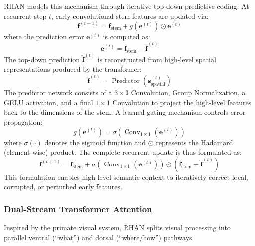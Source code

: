 \documentclass[12pt,a4paper]{article}
\begin{document}
RHAN models this mechanism through iterative top-down predictive coding. At recurrent step $t$, early convolutional stem features are updated via:
\begin{equation}
  \mathbf{f}^{(t+1)} = \mathbf{f}_{\mathrm{stem}} + g(\mathbf{e}^{(t)}) \odot \mathbf{e}^{(t)}
  \label{eq:feedback_update}
\end{equation}
where the prediction error $\mathbf{e}^{(t)}$ is computed as:
\begin{equation}
  \mathbf{e}^{(t)} = \mathbf{f}_{\mathrm{stem}} - \hat{\mathbf{f}}^{(t)}
\end{equation}
The top-down prediction $\hat{\mathbf{f}}^{(t)}$ is reconstructed from high-level spatial representations produced by the transformer:
\begin{equation}
  \hat{\mathbf{f}}^{(t)} = \operatorname{Predictor}\left(\mathbf{s}_{\mathrm{spatial}}^{(t)}\right)
\end{equation}
The predictor network consists of a $3\times3$ Convolution, Group Normalization, a GELU activation, and a final $1\times1$ Convolution to project the high-level features back to the dimensions of the stem. A learned gating mechanism controls error propagation:
\begin{equation}
  g(\mathbf{e}^{(t)}) = \sigma\left(\operatorname{Conv}_{1\times1}(\mathbf{e}^{(t)})\right)
\end{equation}
where $\sigma(\cdot)$ denotes the sigmoid function and $\odot$ represents the Hadamard (element-wise) product. The complete recurrent update is thus formulated as:
\begin{equation}
  \mathbf{f}^{(t+1)} = \mathbf{f}_{\mathrm{stem}} + \sigma\left(\operatorname{Conv}_{1\times1}(\mathbf{e}^{(t)})\right) \odot \left(\mathbf{f}_{\mathrm{stem}} - \hat{\mathbf{f}}^{(t)}\right)
\end{equation}
This formulation enables high-level semantic context to iteratively correct local, corrupted, or perturbed early features.

\subsubsection{Dual-Stream Transformer Attention}
Inspired by the primate visual system, RHAN splits visual processing into parallel ventral (``what'') and dorsal (``where/how'') pathways. 
\end{document}
